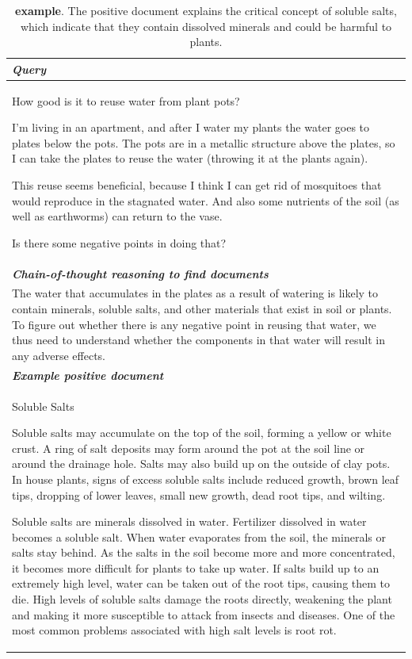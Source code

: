 \begin{table}[ht]
\caption{\textbf{\sustainable example}. The positive document explains the critical concept of soluble salts, which indicate that they contain dissolved minerals and could be harmful to plants.}
\centering
\begin{tabular}{p{13cm}}
\toprule
\textit{\textbf{Query}} \\
\midrule
How good is it to reuse water from plant pots?

I'm living in an apartment, and after I water my plants the water goes to plates below the pots. The pots are in a metallic structure above the plates, so I can take the plates to reuse the water (throwing it at the plants again).

This reuse seems beneficial, because I think I can get rid of mosquitoes that would reproduce in the stagnated water. And also some nutrients of the soil (as well as earthworms) can return to the vase.

Is there some negative points in doing that? \\
\midrule
\textit{\textbf{Chain-of-thought reasoning to find documents}} \\
\midrule
The water that accumulates in the plates as a result of watering is likely to contain minerals, soluble salts, and other materials that exist in soil or plants. 
To figure out whether there is any negative point in reusing that water, we thus need to understand whether the components in that water will result in any adverse effects. \\
\midrule
\textit{\textbf{Example positive document}} \\
\midrule
Soluble Salts

Soluble salts may accumulate on the top of the soil, forming a yellow or white crust. A ring of salt deposits may form around the pot at the soil line or around the drainage hole. Salts may also build up on the outside of clay pots. In house plants, signs of excess soluble salts include reduced growth, brown leaf tips, dropping of lower leaves, small new growth, dead root tips, and wilting.

Soluble salts are minerals dissolved in water. Fertilizer dissolved in water becomes a soluble salt. When water evaporates from the soil, the minerals or salts stay behind. As the salts in the soil become more and more concentrated, it becomes more difficult for plants to take up water. If salts build up to an extremely high level, water can be taken out of the root tips, causing them to die. High levels of soluble salts damage the roots directly, weakening the plant and making it more susceptible to attack from insects and diseases. One of the most common problems associated with high salt levels is root rot.


\end{tabular}
\end{table}
